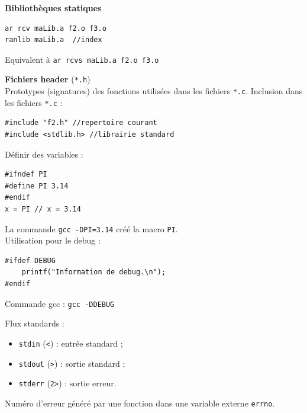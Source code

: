 \documentclass[french]{scrartcl}
\begin{document}
\begin{multicols}{3}
\vskip 10pt
\textbf{Bibliothèques statiques}
\vspace{-5pt}\begin{lstlisting}
ar rcv maLib.a f2.o f3.o
ranlib maLib.a	//index
\end{lstlisting}\vspace{-5pt}
Equivalent à \lstinline!ar rcvs maLib.a f2.o f3.o!

\textbf{Fichiers header} (\lstinline!*.h!)\\
Prototypes (signatures) des fonctions utilisées dans les fichiers \lstinline!*.c!. Inclusion dans les fichiers \lstinline!*.c! :
\vspace{-5pt}\begin{lstlisting}
#include "f2.h" //repertoire courant
#include <stdlib.h> //librairie standard 
\end{lstlisting}\vspace{-5pt}

Définir des variables :
\vspace{-5pt}\begin{lstlisting}
#ifndef PI
#define PI 3.14
#endif
x = PI // x = 3.14
\end{lstlisting}\vspace{-5pt}
La commande \lstinline!gcc -DPI=3.14! créé la macro \lstinline!PI!.\\
Utilisation pour le debug :
\vspace{-5pt}\begin{lstlisting}
#ifdef DEBUG
	printf("Information de debug.\n");
#endif
\end{lstlisting}\vspace{-5pt}
Commande gcc : \lstinline!gcc -DDEBUG!


\vskip 10pt
Flux standards :\begin{itemize}
	\item \lstinline!stdin! (\lstinline!<!) : entrée standard ;
	\item \lstinline!stdout! (\lstinline!>!) : sortie standard ;
	\item \lstinline!stderr! (\lstinline!2>!) : sortie erreur.
\end{itemize}
Numéro d'erreur généré par une fonction dans une variable externe \lstinline!errno!.


\end{multicols}
\end{document}
